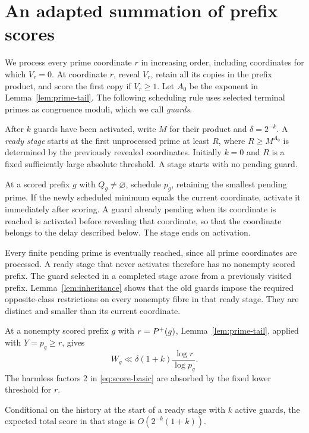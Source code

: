 \section{An adapted summation of prefix scores}\label{sec:scheduling}

We process every prime coordinate \(r\) in increasing order,
including coordinates for which \(V_r=0\). At coordinate
\(r\), reveal \(V_r\), retain all its copies in the prefix
product, and score the first copy if \(V_r\ge1\).
Let \(A_0\) be the exponent in Lemma~\ref{lem:prime-tail}.
The following scheduling rule uses selected terminal
primes as congruence moduli, which we call \emph{guards}.

After \(k\) guards have been activated, write \(M\) for
their product and \(\delta=2^{-k}\). A \emph{ready stage}
starts at the first unprocessed prime at least \(R\),
where \(R\ge M^{A_0}\) is determined by the previously
revealed coordinates. Initially \(k=0\) and \(R\) is a
fixed sufficiently large absolute threshold. A stage
starts with no pending guard.

At a scored prefix \(g\) with \(Q_g\ne\varnothing\),
schedule \(p_g\), retaining the smallest pending prime.
If the newly scheduled minimum equals the current
coordinate, activate it immediately after scoring.
A guard already pending when its coordinate is reached
is activated before revealing that coordinate, so that
the coordinate belongs to the delay described below.
The stage ends on activation.

Every finite pending prime is eventually reached, since
all prime coordinates are processed. A ready stage that
never activates therefore has no nonempty scored prefix.
The guard selected in a completed stage arose from a
previously visited prefix. Lemma~\ref{lem:inheritance}
shows that the old guards impose the required opposite-class
restrictions on every nonempty fibre in that ready stage.
They are distinct and smaller than its current coordinate.

At a nonempty scored prefix \(g\) with \(r=P^{+}(g)\),
Lemma~\ref{lem:prime-tail}, applied with \(Y=p_g\ge r\),
gives
\begin{equation}\label{eq:score-guarded}
 W_g\ll \delta(1+k)\frac{\log r}{\log p_g}.
\end{equation}
The harmless factors 2 in \eqref{eq:score-basic} are
absorbed by the fixed lower threshold for \(r\).

\begin{lemma}\label{lem:ready-cost}
Conditional on the history at the start of a ready
stage with \(k\) active guards, the expected total score
in that stage is \(O(2^{-k}(1+k))\).
\end{lemma}


